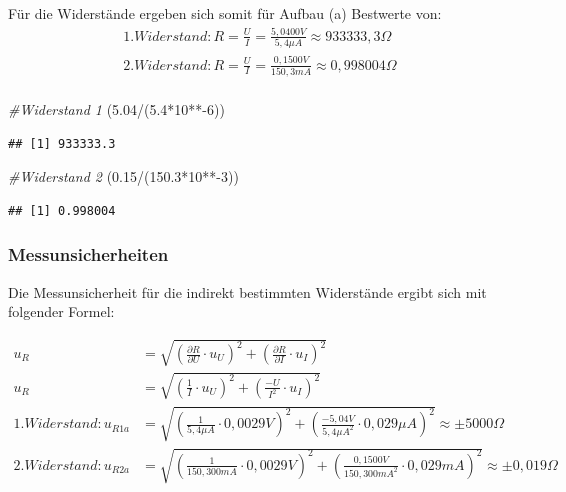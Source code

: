 \documentclass[class=article, crop=false]{standalone}
\newenvironment{Shaded}{\begin{snugshade}}{\end{snugshade}}
\newcommand{\CommentTok}[1]{\textcolor[rgb]{0.56,0.35,0.01}{\textit{#1}}}
\newcommand{\DecValTok}[1]{\textcolor[rgb]{0.00,0.00,0.81}{#1}}
\newcommand{\FloatTok}[1]{\textcolor[rgb]{0.00,0.00,0.81}{#1}}
\newcommand{\NormalTok}[1]{#1}
\newcommand{\SpecialCharTok}[1]{\textcolor[rgb]{0.00,0.00,0.00}{#1}}
\begin{document}
Für die Widerstände ergeben sich somit für Aufbau (a) Bestwerte von:
\begin{equation*}
\begin{split}
1. Widerstand: R=\frac{U}{I} = \frac {5,0400V}{5,4 \mu A} \approx 933333,3 \Omega \\
2.Widerstand: R=\frac{U}{I} = \frac {0,1500V}{150,3 mA} \approx 0,998004 \Omega \\
\end{split}
\end{equation*}

\begin{Shaded}
\begin{Highlighting}[]
\CommentTok{\#Widerstand 1}
\NormalTok{(}\FloatTok{5.04}\SpecialCharTok{/}\NormalTok{(}\FloatTok{5.4}\SpecialCharTok{*}\DecValTok{10}\SpecialCharTok{**{-}}\DecValTok{6}\NormalTok{))}
\end{Highlighting}
\end{Shaded}

\begin{verbatim}
## [1] 933333.3
\end{verbatim}

\begin{Shaded}
\begin{Highlighting}[]
\CommentTok{\#Widerstand 2}
\NormalTok{(}\FloatTok{0.15}\SpecialCharTok{/}\NormalTok{(}\FloatTok{150.3}\SpecialCharTok{*}\DecValTok{10}\SpecialCharTok{**{-}}\DecValTok{3}\NormalTok{))}
\end{Highlighting}
\end{Shaded}

\begin{verbatim}
## [1] 0.998004
\end{verbatim}

\hypertarget{messunsicherheiten}{%
\subsubsection{Messunsicherheiten}\label{messunsicherheiten}}

Die Messunsicherheit für die indirekt bestimmten Widerstände ergibt sich
mit folgender Formel:

\begin {equation*}
\begin{split}
u_R &= \sqrt{\left (\frac{\partial R}{\partial U} \cdot u_U\right )^2 + \left (\frac{\partial R}{\partial I} \cdot u_I\right )^2 } \\
u_R &= \sqrt{\left (\frac{1}{I} \cdot u_U\right )^2 + \left (\frac{-U}{I^2} \cdot u_I\right )^2 } \\
1.Widerstand: u_{R1a}&= \sqrt{\left (\frac{1}{5,4\mu A} \cdot 0,0029V\right )^2 + \left (\frac{-5,04V}{5,4\mu A^2} \cdot 0,029 \mu A\right )^2 } \approx \pm 5000\Omega \\
2.Widerstand: u_{R2a}&= \sqrt{\left (\frac{1}{150,300mA} \cdot 0,0029V \right )^2 + \left (\frac{0,1500V}{150,300mA^2} \cdot 0,029mA\right )^2 } \approx \pm 0,019 \Omega
\end{split}
\end{equation*}
\end{document}
